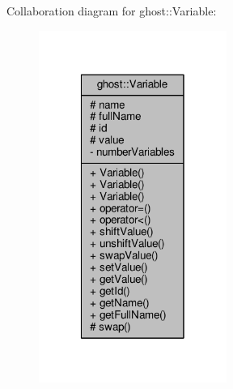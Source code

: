 Collaboration diagram for ghost\-:\-:Variable\-:\nopagebreak
\begin{figure}[H]
\begin{center}
\leavevmode
\includegraphics[width=174pt]{classghost_1_1Variable__coll__graph}
\end{center}
\end{figure}
